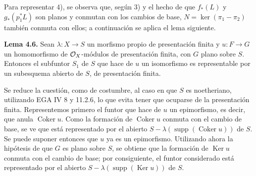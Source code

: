 Para representar 4), se observa que, según 3) y el hecho de que $f_*(L)$ y
$g_*(p_1^*L)$ son planos y conmutan con los cambios de base,
$N=\ker(\pi_1-\pi_2)$ también conmuta con ellos; a continuación se aplica el
lema siguiente.

\textbf{Lema 4.6.} Sean $\lambda:X\to S$ un morfismo propio de presentación
finita y $u:F\to G$ un homomorfismo de
$\sisi{\mathcal O_Y}{\mathcal O_X}$-módulos de presentación finita, con $G$
plano sobre $S$. Entonces el subfuntor $S_1$ de $S$ que hace de $u$ un
isomorfismo es representable por un subesquema abierto de $S$, de
presentación finita.

Se reduce la cuestión, como de costumbre, al caso en que $S$ es
noetheriano, utilizando EGA IV 8 y 11.2.6, lo que evita tener que ocuparse de
la presentación finita. Representemos primero el funtor que hace de $u$ un
epimorfismo, es decir, que anula $\operatorname{Coker}u$. Como la formación
de $\operatorname{Coker}u$ conmuta con el cambio de base, se ve que está
representado por el abierto
$S-\lambda(\operatorname{supp}(\operatorname{Coker}u))$ de $S$. Se puede
suponer entonces que $u$ ya es un epimorfismo. Utilizando ahora la hipótesis
de que $G$ es plano sobre $S$, se obtiene que la formación de
$\operatorname{Ker}u$ conmuta con el cambio de base; por consiguiente, el
funtor considerado está representado por el abierto
$S-\lambda(\operatorname{supp}(\operatorname{Ker}u))$ de $S$.

\providecommand{\Ass}{\operatorname{Ass}}
\providecommand{\Hom}{\operatorname{Hom}}
\providecommand{\Ext}{\operatorname{Ext}}
\providecommand{\Proj}{\operatorname{Proj}}
\providecommand{\NS}{\operatorname{NS}}
\providecommand{\Tors}{\operatorname{Tors}}
\providecommand{\Picnum}{\operatorname{Pic}^{\mathrm{num}}}
\providecommand{\Piczero}{\operatorname{Pic}^{0}}
\providecommand{\Pictau}{\operatorname{Pic}^{\tau}}
\providecommand{\length}{\operatorname{length}}
\providecommand{\etale}{\text{\'etale}}


